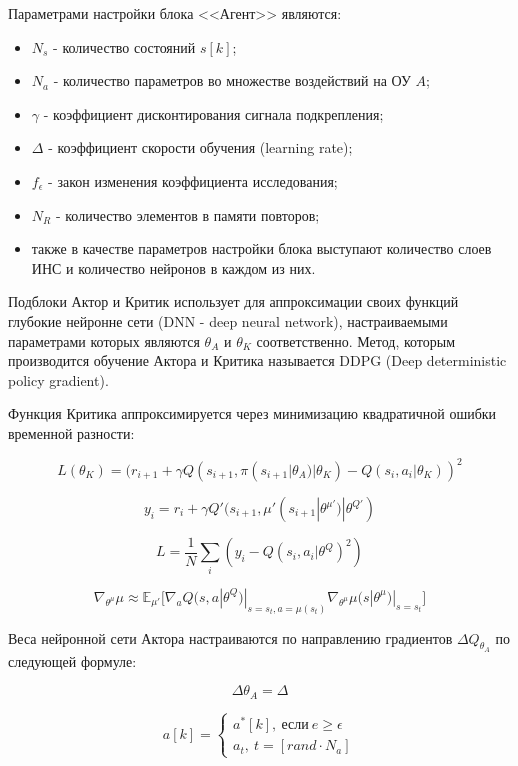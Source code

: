 Параметрами настройки блока <<Агент>> являются:
\begin{itemize}
	\item $ N_s $ - количество состояний $s[k]$;
	\item $ N_a $ - количество параметров во множестве воздействий на ОУ $ A $;
	\item $ \gamma $ - коэффициент дисконтирования сигнала подкрепления;
	\item $ \Delta $ - коэффициент скорости обучения (learning rate);
	\item $ f_{\epsilon} $ - закон изменения коэффициента исследования;
	\item $ N_R $ - количество элементов в памяти повторов;
	\item также в качестве параметров настройки блока выступают количество слоев ИНС и количество нейронов в каждом из них.
\end{itemize}

Подблоки Актор и Критик использует для аппроксимации своих функций глубокие нейронне сети (DNN - deep neural network), настраиваемыми параметрами которых являются $ \theta_A $ и $ \theta_K $ соответственно. Метод, которым производится обучение Актора и Критика называется DDPG (Deep deterministic policy gradient). 

Функция Критика аппроксимируется через минимизацию квадратичной ошибки временной разности:

$$
L(\theta_K) = (r_{i+1} + \gamma Q(s_{i+1}, \pi(s_{i+1}|\theta_A)|\theta_K) - Q(s_i, a_i|\theta_K))^2
$$

$$
y_i = r_i + \gamma Q'(s_{i + 1}, \mu'(s_{i+1}|\theta^{\mu'})|\theta^{Q'})
$$

$$
L = \frac{1}{N} \sum_{i} (y_i - Q(s_i, a_i | \theta^{Q})^2) 
$$

$$
\nabla_{\theta^{\mu}} \mu \approx \mathbb{E}_{\mu'} \big [ \nabla_{a} Q(s, a|\theta^{Q})|_{s=s_t,a=\mu(s_t)} \nabla_{\theta^{\mu}} \mu(s|\theta^{\mu})|_{s=s_t} \big ]
$$

Веса нейронной сети Актора настраиваются по направлению градиентов $ \Delta Q_{\theta_A} $ по следующей формуле:

$$ 
\Delta \theta_A = \Delta
$$

$$
a[k] = 
\begin{cases}
a^*[k], \: \text{если} \: e \geq \epsilon  \\
a_t, \: t=[rand \cdot N_a]
\end{cases}
$$

